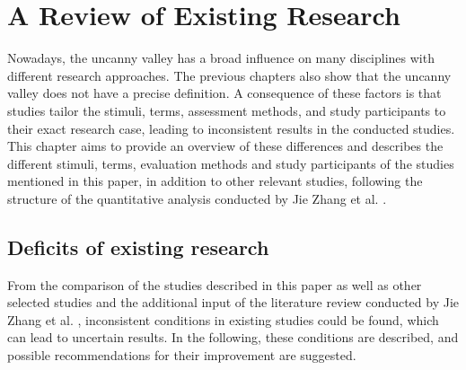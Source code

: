 \chapter{A Review of Existing Research}
Nowadays, the uncanny valley has a broad influence on many disciplines with different research approaches. The previous chapters also show that the uncanny valley does not have a precise definition. A consequence of these factors is that studies tailor the stimuli, terms, assessment methods, and study participants to their exact research case, leading to inconsistent results in the conducted studies.
This chapter aims to provide an overview of these differences and describes the different stimuli, terms, evaluation methods and study participants of the studies mentioned in this paper, in addition to other relevant studies, following the structure of the quantitative analysis conducted by Jie Zhang et al. \cite{quant_review}.

 \section{Deficits of existing research}
 From the comparison of the studies described in this paper as well as other selected studies and the additional input of the literature review conducted by Jie Zhang et al. \cite{quant_review}, inconsistent conditions in existing studies could be found, which can lead to uncertain results. In the following, these conditions are described, and possible recommendations for their improvement are suggested. 

